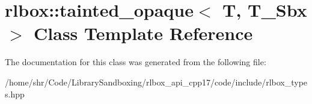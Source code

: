 \hypertarget{classrlbox_1_1tainted__opaque}{}\section{rlbox\+:\+:tainted\+\_\+opaque$<$ T, T\+\_\+\+Sbx $>$ Class Template Reference}
\label{classrlbox_1_1tainted__opaque}


The documentation for this class was generated from the following file\+:\begin{DoxyCompactItemize}
\item 
/home/shr/\+Code/\+Library\+Sandboxing/rlbox\+\_\+api\+\_\+cpp17/code/include/rlbox\+\_\+types.\+hpp\end{DoxyCompactItemize}
